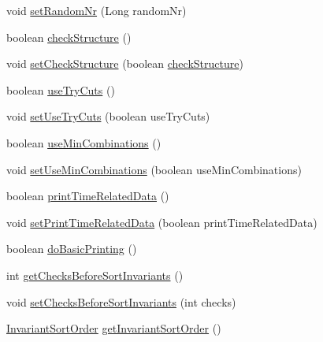 \begin{DoxyCompactItemize}
void \hyperlink{classorg_1_1tzi_1_1use_1_1gen_1_1tool_1_1_g_generator_arguments_ad12a8af14d7d56e2fb8d760c540faa86}{set\-Random\-Nr} (Long random\-Nr)
\item 
boolean \hyperlink{classorg_1_1tzi_1_1use_1_1gen_1_1tool_1_1_g_generator_arguments_a7c5a5f6c4fcf7dcfe3fe9474f3fc518d}{check\-Structure} ()
\item 
void \hyperlink{classorg_1_1tzi_1_1use_1_1gen_1_1tool_1_1_g_generator_arguments_aa46e62d1f12ccc6f11ce129b778a6c29}{set\-Check\-Structure} (boolean \hyperlink{classorg_1_1tzi_1_1use_1_1gen_1_1tool_1_1_g_generator_arguments_a7c5a5f6c4fcf7dcfe3fe9474f3fc518d}{check\-Structure})
\item 
boolean \hyperlink{classorg_1_1tzi_1_1use_1_1gen_1_1tool_1_1_g_generator_arguments_a9637d553b5c9674c35fb7aa0871b33a6}{use\-Try\-Cuts} ()
\item 
void \hyperlink{classorg_1_1tzi_1_1use_1_1gen_1_1tool_1_1_g_generator_arguments_ad5b6a032150a6274f3107530bc2ce083}{set\-Use\-Try\-Cuts} (boolean use\-Try\-Cuts)
\item 
boolean \hyperlink{classorg_1_1tzi_1_1use_1_1gen_1_1tool_1_1_g_generator_arguments_ab035d3c50e40e36554ca5bf0bf425f83}{use\-Min\-Combinations} ()
\item 
void \hyperlink{classorg_1_1tzi_1_1use_1_1gen_1_1tool_1_1_g_generator_arguments_a71135ef8b0e0b2259e148b9ae2ea3fc3}{set\-Use\-Min\-Combinations} (boolean use\-Min\-Combinations)
\item 
boolean \hyperlink{classorg_1_1tzi_1_1use_1_1gen_1_1tool_1_1_g_generator_arguments_ab87ada6a696792a5ef1a36861495bfa0}{print\-Time\-Related\-Data} ()
\item 
void \hyperlink{classorg_1_1tzi_1_1use_1_1gen_1_1tool_1_1_g_generator_arguments_afdfb0c2b8c41463790d38acb986ee1ef}{set\-Print\-Time\-Related\-Data} (boolean print\-Time\-Related\-Data)
\item 
boolean \hyperlink{classorg_1_1tzi_1_1use_1_1gen_1_1tool_1_1_g_generator_arguments_a093318a5b9355d98ee70be2a030fd158}{do\-Basic\-Printing} ()
\item 
int \hyperlink{classorg_1_1tzi_1_1use_1_1gen_1_1tool_1_1_g_generator_arguments_a42f9b3dd13fe225d075bd108d4928afe}{get\-Checks\-Before\-Sort\-Invariants} ()
\item 
void \hyperlink{classorg_1_1tzi_1_1use_1_1gen_1_1tool_1_1_g_generator_arguments_a5adbefa0115ecd5b6c59ab09e853c2e5}{set\-Checks\-Before\-Sort\-Invariants} (int checks)
\item 
\hyperlink{enumorg_1_1tzi_1_1use_1_1gen_1_1tool_1_1_g_generator_arguments_1_1_invariant_sort_order}{Invariant\-Sort\-Order} \hyperlink{classorg_1_1tzi_1_1use_1_1gen_1_1tool_1_1_g_generator_arguments_a71f1aef4f606e7c98033b64e2ab95011}{get\-Invariant\-Sort\-Order} ()

\end{DoxyCompactItemize}
